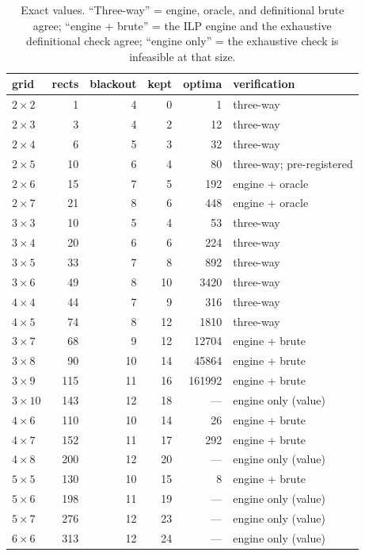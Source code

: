 \documentclass[12pt]{article}
\theoremstyle{definition}\newtheorem{definition}{Definition}
\theoremstyle{remark}\newtheorem{remark}{Remark}
\begin{document}
\begin{table}[h]\centering
\begin{tabular}{lrrrrl}
\toprule
grid & rects & blackout & kept & optima & verification \\
\midrule
$2\times 2$ & 1 & 4 & 0 & 1 & three-way \\
$2\times 3$ & 3 & 4 & 2 & 12 & three-way \\
$2\times 4$ & 6 & 5 & 3 & 32 & three-way \\
$2\times 5$ & 10 & 6 & 4 & 80 & three-way; pre-registered \\
$2\times 6$ & 15 & 7 & 5 & 192 & engine + oracle \\
$2\times 7$ & 21 & 8 & 6 & 448 & engine + oracle \\
$3\times 3$ & 10 & 5 & 4 & 53 & three-way \\
$3\times 4$ & 20 & 6 & 6 & 224 & three-way \\
$3\times 5$ & 33 & 7 & 8 & 892 & three-way \\
$3\times 6$ & 49 & 8 & 10 & 3420 & three-way \\
$4\times 4$ & 44 & 7 & 9 & 316 & three-way \\
$4\times 5$ & 74 & 8 & 12 & 1810 & three-way \\
$3\times 7$ & 68 & 9 & 12 & 12704 & engine + brute \\
$3\times 8$ & 90 & 10 & 14 & 45864 & engine + brute \\
$3\times 9$ & 115 & 11 & 16 & 161992 & engine + brute \\
$3\times 10$ & 143 & 12 & 18 & --- & engine only (value) \\
$4\times 6$ & 110 & 10 & 14 & 26 & engine + brute \\
$4\times 7$ & 152 & 11 & 17 & 292 & engine + brute \\
$4\times 8$ & 200 & 12 & 20 & --- & engine only (value) \\
$5\times 5$ & 130 & 10 & 15 & 8 & engine + brute \\
$5\times 6$ & 198 & 11 & 19 & --- & engine only (value) \\
$5\times 7$ & 276 & 12 & 23 & --- & engine only (value) \\
$6\times 6$ & 313 & 12 & 24 & --- & engine only (value) \\
\bottomrule
\end{tabular}
\caption{Exact values. ``Three-way'' = engine, oracle, and definitional brute agree;
``engine + brute'' = the ILP engine and the exhaustive definitional check agree;
``engine only'' = the exhaustive check is infeasible at that size.}
\end{table}
\end{document}
